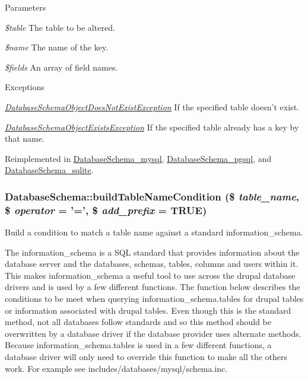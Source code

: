 \begin{DoxyParams}{Parameters}
\item[{\em \$table}]The table to be altered. \item[{\em \$name}]The name of the key. \item[{\em \$fields}]An array of field names.\end{DoxyParams}

\begin{DoxyExceptions}{Exceptions}
\item[{\em \hyperlink{classDatabaseSchemaObjectDoesNotExistException}{DatabaseSchemaObjectDoesNotExistException}}]If the specified table doesn't exist. \item[{\em \hyperlink{classDatabaseSchemaObjectExistsException}{DatabaseSchemaObjectExistsException}}]If the specified table already has a key by that name. \end{DoxyExceptions}


Reimplemented in \hyperlink{classDatabaseSchema__mysql_a5e5e984d6f48b61962290a4715e3c143}{DatabaseSchema\_\-mysql}, \hyperlink{classDatabaseSchema__pgsql_a950dbc66389f5bf5028dfd6b310e4092}{DatabaseSchema\_\-pgsql}, and \hyperlink{classDatabaseSchema__sqlite_ad180a50d157cd3488cf81f8cc08dd80f}{DatabaseSchema\_\-sqlite}.\hypertarget{classDatabaseSchema_a4a2510c6b95598b613355d1a9b9a706f}{
\subsubsection[{buildTableNameCondition}]{\setlength{\rightskip}{0pt plus 5cm}DatabaseSchema::buildTableNameCondition (\$ {\em table\_\-name}, \/  \$ {\em operator} = {\ttfamily '='}, \/  \$ {\em add\_\-prefix} = {\ttfamily TRUE})}}
\label{classDatabaseSchema_a4a2510c6b95598b613355d1a9b9a706f}
Build a condition to match a table name against a standard information\_\-schema.

The information\_\-schema is a SQL standard that provides information about the database server and the databases, schemas, tables, columns and users within it. This makes information\_\-schema a useful tool to use across the drupal database drivers and is used by a few different functions. The function below describes the conditions to be meet when querying information\_\-schema.tables for drupal tables or information associated with drupal tables. Even though this is the standard method, not all databases follow standards and so this method should be overwritten by a database driver if the database provider uses alternate methods. Because information\_\-schema.tables is used in a few different functions, a database driver will only need to override this function to make all the others work. For example see includes/databases/mysql/schema.inc.


